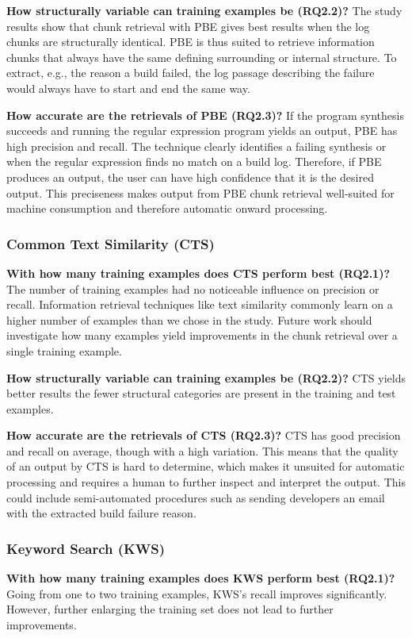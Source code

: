 \noindent
\textbf{How structurally variable can training examples be (RQ2.2)?}
The study results show that chunk retrieval with PBE gives best
results when the log chunks are structurally identical.
PBE is thus suited to retrieve information
chunks that always have the same defining surrounding or internal
structure.
To extract, e.g., the reason a build failed, the log
passage describing the failure would always have to start and
end the same way.

\noindent
\textbf{How accurate are the retrievals of PBE (RQ2.3)?}
If the program synthesis succeeds and running the regular expression
program yields an output, PBE has high precision and recall.
The technique
clearly identifies a failing synthesis or when the regular expression
finds no match on a build log.
Therefore, if PBE produces
an output, the user can have high confidence that it is the desired
output.
This preciseness makes output from PBE chunk retrieval
well-suited for machine consumption and therefore automatic onward
processing.

\subsubsection{Common Text Similarity (CTS)}

\noindent
\textbf{With how many training examples does CTS perform best (RQ2.1)?}
The number of training examples had no noticeable influence on
precision or recall.
Information retrieval techniques
like text similarity commonly learn on a higher number of examples
than we chose in the study.
Future work should investigate how many
examples yield improvements in the chunk retrieval over a single
training example.

\noindent
\textbf{How structurally variable can training examples be (RQ2.2)?}
CTS yields better results the
fewer structural categories are present in the training and test
examples.

\noindent
\textbf{How accurate are the retrievals of CTS (RQ2.3)?}
CTS has good precision and recall on average, though with a high
variation.
This means that the quality of an output by CTS is hard to
determine, which makes it unsuited for automatic processing and requires
a human to further inspect and interpret the output.
This could include semi-automated procedures such as sending
developers an email with the extracted build failure reason.

\subsubsection{Keyword Search (KWS)}
\noindent
\textbf{With how many training examples does KWS perform best (RQ2.1)?}
Going from one to two training examples, KWS's recall improves
significantly.
However, further enlarging the training set
does not lead to further improvements.

